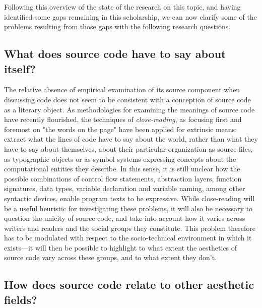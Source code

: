 Following this overview of the state of the research on this topic, and having identified some gaps remaining in this scholarship, we can now clarify some of the problems resulting from those gaps with the following research questions.

\subsection{What does source code have to say about itself?}
\label{subsec:research-question-1}

The relative absence of empirical examination of its source component when discussing code does not seem to be consistent with a conception of source code as a literary object. As methodologies for examining the meanings of source code have recently flourished, the techniques of \emph{close-reading}, as focusing first and foremost on "the words on the page" \citep{richards_practical_1930} have been applied for extrinsic means: extract what the lines of code have to say about the world, rather than what they have to say about themselves, about their particular organization as source files, as typographic objects or as symbol systems expressing concepts about the computational entities they describe. In this sense, it is still unclear how the possible combinations of control flow statements, abstraction layers, function signatures, data types, variable declaration and variable naming, among other syntactic devices, enable program texts to be expressive. While close-reading will be a useful heuristic for investigating these problems, it will also be necessary to question the unicity of source code, and take into account how it varies across writers and readers and the social groups they constitute. This problem therefore has to be modulated with respect to the socio-technical environment in which it exists—it will then be possible to highlight to what extent the aesthetics of source code vary across these groups, and to what extent they don't.

\subsection{How does source code relate to other aesthetic fields?}
\label{subsec:research-question-2}


